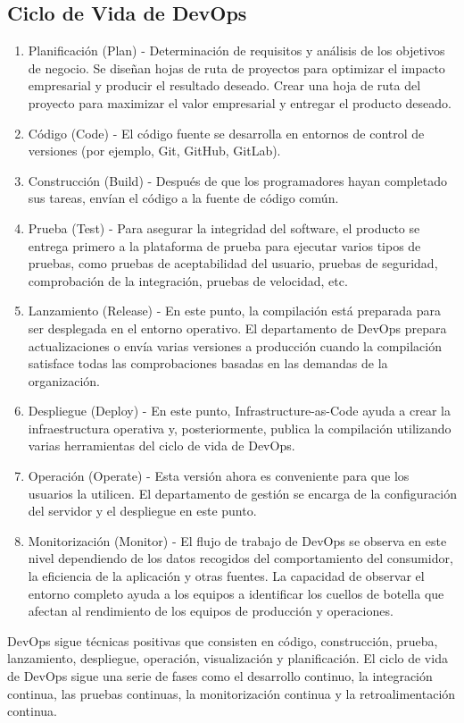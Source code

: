 \documentclass[12pt]{book}
\begin{document}
\subsection{Ciclo de Vida de DevOps}
\begin{enumerate}
    \item Planificación (Plan) - Determinación de requisitos y análisis de los objetivos de negocio. Se diseñan hojas de ruta de proyectos para optimizar el impacto empresarial y producir el resultado deseado. Crear una hoja de ruta del proyecto para maximizar el valor empresarial y entregar el producto deseado.
    \item Código (Code) - El código fuente se desarrolla en entornos de control de versiones (por ejemplo, Git, GitHub, GitLab).
    \item Construcción (Build) - Después de que los programadores hayan completado sus tareas, envían el código a la fuente de código común.
    \item Prueba (Test) - Para asegurar la integridad del software, el producto se entrega primero a la plataforma de prueba para ejecutar varios tipos de pruebas, como pruebas de aceptabilidad del usuario, pruebas de seguridad, comprobación de la integración, pruebas de velocidad, etc.
    \item Lanzamiento (Release) - En este punto, la compilación está preparada para ser desplegada en el entorno operativo. El departamento de DevOps prepara actualizaciones o envía varias versiones a producción cuando la compilación satisface todas las comprobaciones basadas en las demandas de la organización.
    \item Despliegue (Deploy) - En este punto, Infrastructure-as-Code ayuda a crear la infraestructura operativa y, posteriormente, publica la compilación utilizando varias herramientas del ciclo de vida de DevOps.
    \item Operación (Operate) - Esta versión ahora es conveniente para que los usuarios la utilicen. El departamento de gestión se encarga de la configuración del servidor y el despliegue en este punto.
    \item Monitorización (Monitor) - El flujo de trabajo de DevOps se observa en este nivel dependiendo de los datos recogidos del comportamiento del consumidor, la eficiencia de la aplicación y otras fuentes. La capacidad de observar el entorno completo ayuda a los equipos a identificar los cuellos de botella que afectan al rendimiento de los equipos de producción y operaciones.
\end{enumerate}
DevOps sigue técnicas positivas que consisten en código, construcción, prueba, lanzamiento, despliegue, operación, visualización y planificación. El ciclo de vida de DevOps sigue una serie de fases como el desarrollo continuo, la integración continua, las pruebas continuas, la monitorización continua y la retroalimentación continua.
\end{document}

